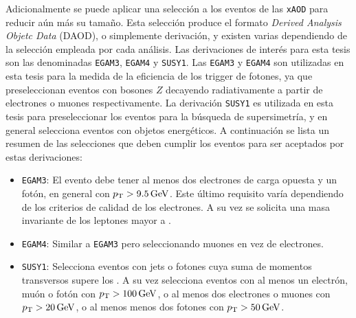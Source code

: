 Adicionalmente se puede aplicar una selección a los eventos de las \texttt{xAOD} para reducir aún más su tamaño. Esta selección produce el formato \textit{Derived Analysis Objetc Data} (DAOD), o simplemente derivación, y existen varias dependiendo de la selección empleada por cada análisis. Las derivaciones de interés para esta tesis son las denominadas \texttt{EGAM3}, \texttt{EGAM4} y \texttt{SUSY1}. Las \texttt{EGAM3} y \texttt{EGAM4} son utilizadas en esta tesis para la medida de la eficiencia de los trigger de fotones, ya que preseleccionan eventos con bosones $Z$ decayendo radiativamente a partir de electrones o muones respectivamente. La derivación \texttt{SUSY1} es utilizada en esta tesis para preseleccionar los eventos para la búsqueda de supersimetría, y en general selecciona eventos con objetos energéticos. A continuación se lista un resumen de las selecciones que deben cumplir los eventos para ser aceptados por estas derivaciones:


\begin{itemize}
  \item \texttt{EGAM3}: El evento debe tener al menos dos electrones de carga opuesta y un fotón, en general con $p_{\text{T}}>9.5\,\text{GeV}$. Este último requisito varía dependiendo de los criterios de calidad de los electrones. A su vez se solicita una masa invariante de los leptones mayor a .
  \item \texttt{EGAM4}: Similar a \texttt{EGAM3} pero seleccionando muones en vez de electrones.
  \item \texttt{SUSY1}: Selecciona eventos con jets o fotones cuya suma de momentos transversos supere los . A su vez selecciona eventos con al menos un electrón, muón o fotón con $p_{\text{T}}>100\, \text{GeV}$, o al menos dos electrones o muones con $p_{\text{T}}>20\,\text{GeV}$, o al menos menos dos fotones con $p_{\text{T}}>50\, \text{GeV}$.
\end{itemize}




